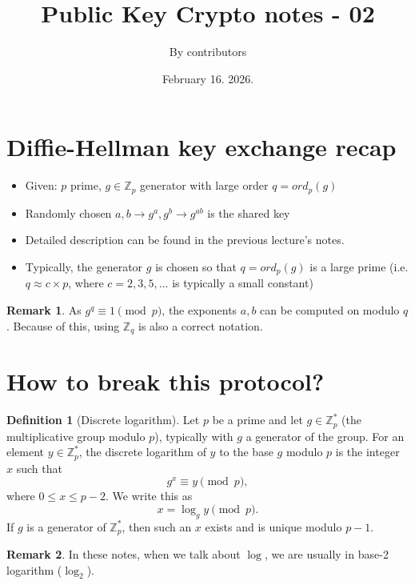 \documentclass[11pt]{article}
\theoremstyle{definition}
\newtheorem{definition}{Definition}[section]
\newtheorem{remark}{Remark}[section]
\theoremstyle{proof}
\begin{document}
\title{Public Key Crypto notes - 02}
\author{By contributors}
\date{February 16. 2026.}
\maketitle

\section{Diffie-Hellman key exchange recap}

\begin{itemize}
    \item Given: $p$ prime, $g \in \mathbb{Z}_p$ generator with large order $q = ord_p(g)$
    \item Randomly chosen $a, b \rightarrow g^a, g^b \rightarrow g^{ab}$ is the shared key
    \item Detailed description can be found in the previous lecture's notes.
    \item Typically, the generator $g$ is chosen so that $q = ord_p(g)$ is a large prime (i.e. $q \approx c \times p$, where $c = 2, 3, 5, \dots$ is typically a small constant)
\end{itemize}

\begin{remark}
	As $g^q \equiv 1 \pmod{p}$, the exponents $a, b$ can be computed on modulo $q$. Because of this, using $\mathbb{Z}_q$ is also a correct notation.
\end{remark}

\section{How to break this protocol?}

\begin{definition}[Discrete logarithm]
	Let $p$ be a prime and let $g \in \mathbb{Z}_p^*$ (the multiplicative group modulo $p$), typically with $g$ a generator of the group.
	For an element $y \in \mathbb{Z}_p^*$, the discrete logarithm of $y$ to the base $g$ modulo $p$ is the integer $x$ such that
	$$g^x \equiv y \pmod{p},$$
	where $0 \le x \le p-2$.
	We write this as
	$$x = \log_g y \pmod{p}.$$
	If $g$ is a generator of $\mathbb{Z}_p^*$, then such an $x$ exists and is unique modulo $p-1$.
\end{definition}

\begin{remark}
	In these notes, when we talk about $\log$, we are usually in base-2 logarithm ($\log_2$).
\end{remark}
\end{document}
